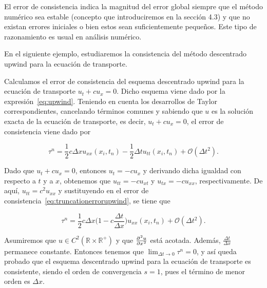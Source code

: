 \begin{remark}
  El error de consistencia indica la magnitud del error global
  siempre que el método numérico sea estable
  (concepto que introduciremos en la sección 4.3) y que no existan
  errores iniciales o bien estos sean suficientemente pequeños.
  Este tipo de razonamiento es usual en análisis numérico.
\end{remark}

En el siguiente ejemplo, estudiaremos la consistencia del método
descentrado upwind para la ecuación de transporte.

\begin{example}
  Calculamos el error de consistencia del esquema descentrado upwind
  para la ecuación de transporte
  \begin{math}
    u_{t}+
    cu_{x}=
    0.
  \end{math}
  Dicho esquema viene dado por la expresión~\eqref{eq:upwind}.
  Teniendo en cuenta los desarrollos de Taylor correspondientes,
  cancelando términos comunes y sabiendo que $u$ es la solución
  exacta de la ecuación de transporte, es decir,
  $u_{t}+cu_{x}=0$, el error de consistencia viene dado por

  \begin{equation}\label{eq:truncationerrorupwind}
    \tau^{n}=
    \frac{1}{2}
    c\Delta x
    u_{xx}
    \left(x_{i},t_{n}\right)-
    \frac{1}{2}\Delta t
    u_{tt}
    \left(x_{i},t_{n}\right)+
    \mathcal{O}
    \left(\Delta t^{2}\right).
  \end{equation}

  Dado que $u_{t}+cu_{x}=0$, entonces $u_{t}=-cu_{x}$ y derivando
  dicha igualdad con respecto a $t$ y a $x$, obtenemos que
  $u_{tt}=-cu_{xt}$ y $u_{tx}=-cu_{xx}$, respectivamente.
  De aquí, $u_{tt}=c^{2}u_{xx}$ y sustituyendo en el error de
  consistencia~\eqref{eq:truncationerrorupwind}, se tiene que

  \begin{equation*}
    \tau^{n}=
    \frac{1}{2}
    c\Delta x
    \big(
    1-c\frac{\Delta t}{\Delta x}
    \big)
    u_{xx}
    \left(x_{i},t_{n}\right)+
    \mathcal{O}
    \left(\Delta t^{2}\right).
  \end{equation*}

  Asumiremos que
  \begin{math}
    u\in
    C^{2}
    \left(
    \mathbb{R}\times
    \mathbb{R}^{+}
    \right)
  \end{math}
  y que $\diffp[2]{u}{x}$ está acotada.
  Además, $\frac{\Delta t}{\Delta x}$ permanece constante.
  Entonces tenemos que $\lim_{\Delta t\to0}\tau^{n}=0$, y así queda
  probado que el esquema descentrado upwind para la
  ecuación de transporte es consistente, siendo el orden de
  convergencia $s=1$, pues el término de menor orden es $\Delta x$.
\end{example}

